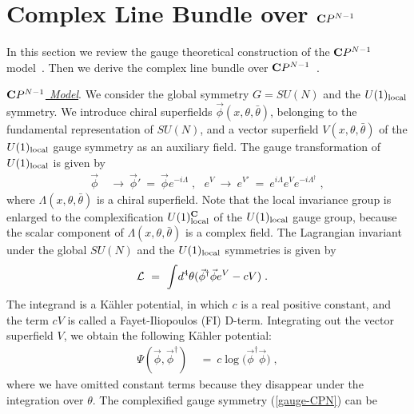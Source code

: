 \documentclass[a4paper,11pt]{article}
\newcommand{\ul}{\underline}
\newcommand{\kahler}{K\"{a}hler }
\begin{document}
{%

\section{Complex Line Bundle over ${\bf C}P^{N-1}$}
\label{Calabi-section}

In this section
we review the gauge theoretical construction 
of the ${\bf C}P^{N-1}$ model~\cite{DDL}.
Then we derive 
the complex line bundle over ${\bf C}P^{N-1}$~\cite{Ca}.

\ul{\sl ${\bf C}P^{N-1}$ Model}. \hfil\break
We consider 
the global symmetry $G = SU(N)$ and the $U(1)_{\rm local}$ symmetry. 
We introduce chiral superfields  
$\vec{\phi}(x, \theta, \bar{\theta})$,  
belonging to the fundamental representation of $SU(N)$, 
and a vector superfield $V (x, \theta, \bar{\theta})$ 
of the $U(1)_{\rm local}$ gauge symmetry 
as an auxiliary field.
The gauge transformation of $U(1)_{\rm local}$ is given by
\begin{align}
\vec{\phi} \ &\to \ 
\vec{\phi}' 
\ = \ 
\vec{\phi} e^{-i \Lambda} \; , \ \ \ 
e^V \ \to \ e^{V'} 
\ = \ 
e^{i \Lambda} e^V e^{-i \Lambda^{\dagger}} \; , \label{gauge-CPN}
\end{align}
where $\Lambda (x, \theta, \bar{\theta})$ is a chiral superfield.
Note that the local invariance group is enlarged 
to  the complexification $U(1)_{\rm local}^{\bf C}$ 
of the $U(1)_{\rm local}$ gauge group,
because the scalar component of 
$\Lambda (x, \theta, \bar{\theta})$ is
a complex field.
The Lagrangian invariant under the global $SU(N)$ and 
the $U(1)_{\rm local}$
symmetries is given by
\begin{align}
{\cal L} 
\ &= \ 
\int \! d^4 \theta 
 (\vec{\phi}^{\dagger} \vec{\phi} e^V - c V)  
 \; . \label{CPN}
\end{align}
The integrand is a \kahler potential, 
in which $c$ is a real positive constant, 
and the term $c V$ is called a Fayet-Iliopoulos (FI) 
D-term.
Integrating out the vector superfield $V$, 
we obtain the following \kahler potential: 
\begin{align}
 \Psi (\vec{\phi}, \vec{\phi}^{\dagger}) 
\ &= \ 
 c \log \big( \vec{\phi}^{\dagger} \vec{\phi} \big) \; , 
\label{CPN-kahler-1}
\end{align}
where we have omitted constant terms because 
they disappear under the integration over $\theta$. 
The complexified gauge symmetry (\ref{gauge-CPN}) can be 
}
\end{document}
